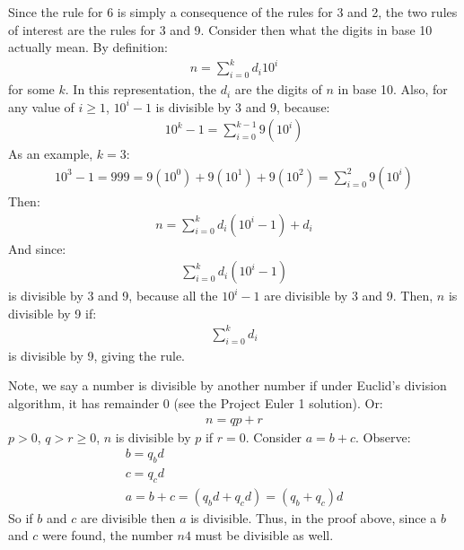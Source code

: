 \documentclass{article}
\begin{document}
Since the rule for 6 is simply a consequence of the rules for 3 and 2, the two rules of interest are the rules for 3 and 9. Consider then what the digits in base 10 actually mean. By definition:
\begin{gather*}
	n = \sum_{i = 0}^{k}d_{i}10^{i}
\end{gather*}
for some $k$. In this representation, the $d_{i}$ are the digits of $n$ in base 10. Also, for any value of $i \ge 1$, $10^{i} - 1$ is divisible by 3 and 9, because:
\begin{gather*}
	10^{k} - 1 = \sum_{i = 0}^{k - 1}9(10^{i})
\end{gather*}
As an example, $k = 3$:
\begin{gather*}
	 10^{3} - 1 = 999 = 9(10^{0}) + 9(10^{1}) + 9(10^{2}) = \sum_{i = 0}^{2}9(10^{i})
\end{gather*}
Then:
\begin{gather*}
	n = \sum_{i = 0}^{k}d_{i}(10^{i} - 1) + d_{i}
\end{gather*}
And since:
\begin{gather*}
\sum_{i = 0}^{k}d_{i}(10^{i} - 1)
\end{gather*}
is divisible by 3 and 9, because all the $10^{i} - 1$ are divisible by 3 and 9. Then, $n$ is divisible by 9 if:
\begin{gather*}
	\sum_{i = 0}^{k}d_{i}
\end{gather*}
is divisible by 9, giving the rule.

Note, we say a number is divisible by another number if under Euclid's division algorithm, it has remainder 0 (see the Project Euler 1 solution). Or:
\begin{gather*}
	n = qp + r
\end{gather*}
$p > 0$, $q > r \ge 0$, $n$ is divisible by $p$ if $r = 0$. Consider $a = b + c$. Observe:
\begin{gather*}
	b = q_{b}d\\
	c = q_{c}d\\
	a = b + c = (q_{b}d + q_{c}d) = (q_{b} + q_{c})d
\end{gather*}
So if $b$ and $c$ are divisible then $a$ is divisible. Thus, in the proof above, since a $b$ and $c$ were found, the number $n4$ must be divisible as well.
\end{document}
